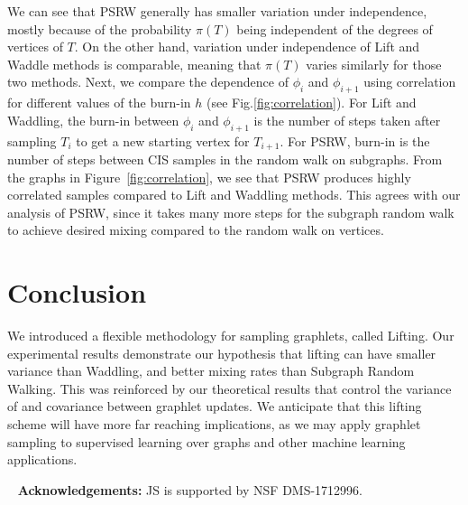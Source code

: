 We can see that PSRW generally has smaller variation under independence, mostly because of the probability $\pi(T)$ being independent of the degrees of vertices of $T$.
On the other hand, variation under independence of Lift and Waddle methods is comparable, meaning that $\pi(T)$ varies similarly for those two methods. 
Next, we compare the dependence of $\phi_i$ and $\phi_{i+1}$ using correlation for different values of the burn-in $h$ (see Fig.\ref{fig:correlation}).
For Lift and Waddling, the burn-in between $\phi_i$ and $\phi_{i+1}$ is the number of steps taken after sampling $T_i$ to get a new starting vertex for $T_{i+1}$.
For PSRW, burn-in is the number of steps between CIS samples in the random walk on subgraphs.
From the graphs in Figure~\ref{fig:correlation}, we see that PSRW produces highly correlated samples compared to Lift and Waddling methods.
This agrees with our analysis of PSRW, since it takes many more steps for the subgraph random walk to achieve desired mixing compared to the random walk on vertices.

\section{Conclusion}
We introduced a flexible methodology for sampling graphlets, called Lifting.
Our experimental results demonstrate our hypothesis that lifting can have smaller variance than Waddling, and better mixing rates than Subgraph Random Walking.
This was reinforced by our theoretical results that control the variance of and covariance between graphlet updates.
We anticipate that this lifting scheme will have more far reaching implications, as we may apply graphlet sampling to supervised learning over graphs and other machine learning applications. 

~\newline
\noindent
{\bf Acknowledgements:} JS is supported by NSF DMS-1712996.




